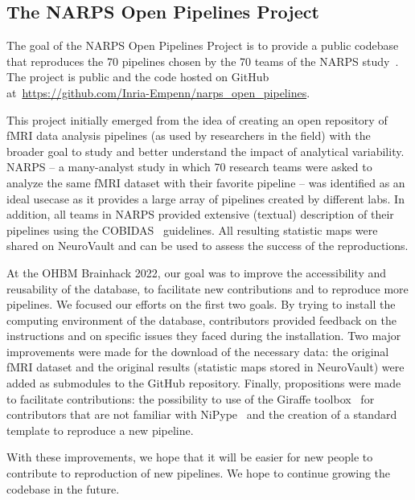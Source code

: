 \documentclass[../main.tex]{subfiles}
\begin{document}
\subsection{The NARPS Open Pipelines Project}

%


The goal of the NARPS Open Pipelines Project is to provide a public codebase that reproduces the 70 pipelines chosen by the 70 teams of the NARPS study~\parencite{botviniknezer2020}. The project is public and the code hosted on GitHub at~\url{https://github.com/Inria-Empenn/narps_open_pipelines}.

This project initially emerged from the idea of creating an open repository of fMRI data analysis pipelines (as used by researchers in the field) with the broader goal to study and better understand the impact of analytical variability. NARPS -- a many-analyst study in which 70 research teams were asked to analyze the same fMRI dataset with their favorite pipeline -- was identified as an ideal usecase as it provides a large array of pipelines created by different labs. In addition, all teams in NARPS provided extensive (textual) description of their pipelines using the COBIDAS~\parencite{nichols2017} guidelines. All resulting statistic maps were shared on NeuroVault \parencite{gorgolewski2015} and can be used to assess the success of the reproductions. 

At the OHBM Brainhack 2022, our goal was to improve the accessibility and reusability of the database, to facilitate new contributions and to reproduce more pipelines. We focused our efforts on the first two goals. By trying to install the computing environment of the database, contributors provided feedback on the instructions and on specific issues they faced during the installation. Two major improvements were made for the download of the necessary data: the original fMRI dataset and the original results (statistic maps stored in NeuroVault) were added as submodules to the GitHub repository. Finally, propositions were made to facilitate contributions: the possibility to use of the Giraffe toolbox~\parencite{vanMourik2016} for contributors that are not familiar with NiPype~\parencite{gorgolewski2017} and the creation of a standard template to reproduce a new pipeline. 

With these improvements, we hope that it will be easier for new people to contribute to reproduction of new pipelines. We hope to continue growing the codebase in the future. 
\end{document}
